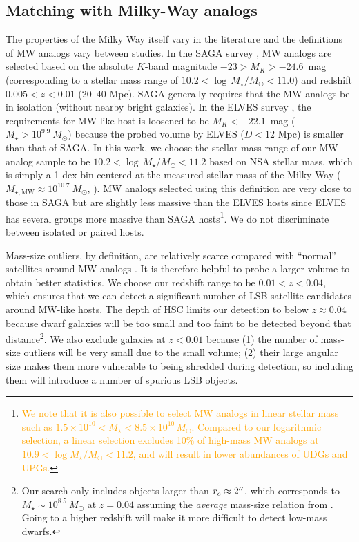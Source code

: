 \documentclass[twocolumn,astrosymb,twocolappendix,linenumbers]{aastex631}
\newcommand{\emphasize}{\textcolor{orange}}
\begin{document}
\begin{CJK*}{UTF8}{gbsn}
\subsection{Matching with Milky-Way analogs}\label{sec:match}
The properties of the Milky Way itself vary in the literature \citep{Licquia2015,Bland-Hawthorn2016} and the definitions of MW analogs vary between studies. In the SAGA survey \citep{SAGA-I,SAGA-II}, MW analogs are selected based on the absolute $K$-band magnitude $-23 > M_K > -24.6$~mag (corresponding to a stellar mass range of $10.2 < \log\, M_\star/M_\odot < 11.0$) and redshift $0.005 < z < 0.01$ (20--40 Mpc). SAGA generally requires that the MW analogs be in isolation (without nearby bright galaxies). In the ELVES survey \citep{ELVES-I,ELVES-II,CarlstenELVES2022}, the requirements for MW-like host is loosened to be $M_K < -22.1$~mag ($M_\star > 10^{9.9}\ M_\odot$) because the probed volume by ELVES ($D<12$ Mpc) is smaller than that of SAGA. In this work, we choose the stellar mass range of our MW analog sample to be $10.2 < \log\, M_\star/M_\odot < 11.2$ based on NSA stellar mass, which is simply a 1 dex bin centered at the measured stellar mass of the Milky Way ($M_{\star, \mathrm{MW}}\approx 10^{10.7}\ M_\odot$, \citealt{Licquia2015}). MW analogs selected using this definition are very close to those in SAGA but are slightly less massive than the ELVES hosts since ELVES has several groups more massive than SAGA hosts\footnote{\emphasize{We note that it is also possible to select MW analogs in linear stellar mass such as $1.5 \times 10^{10} < M_\star < 8.5\times 10^{10}\,M_\odot$. Compared to our logarithmic selection, a linear selection excludes 10\% of high-mass MW analogs at $10.9 < \log M_\star/M_\odot < 11.2$, and will result in lower abundances of UDGs and UPGs.}}. We do not discriminate between isolated or paired hosts. 

Mass-size outliers, by definition, are relatively scarce compared with ``normal'' satellites around MW analogs \citep{SAGA-II,CarlstenELVES2022}. It is therefore helpful to probe a larger volume to obtain better statistics. We choose our redshift range to be $0.01 < z < 0.04$, which ensures that we can detect a significant number of LSB satellite candidates around MW-like hosts. The depth of HSC limits our detection to below $z \approx 0.04$ because dwarf galaxies will be too small and too faint to be detected beyond that distance\footnote{Our search only includes objects larger than $r_e\approx 2\mbox{$^{\prime\prime}$}$, which corresponds to $M_\star \sim 10^{8.5}\ M_\odot$ at $z=0.04$ assuming the \textit{average} mass-size relation from \citet{ELVES-I}. Going to a higher redshift will make it more difficult to detect low-mass dwarfs.}. We also exclude galaxies at $z<0.01$ because (1) the number of mass-size outliers will be very small due to the small volume; (2) their large angular size makes them more vulnerable to being shredded during detection, so including them will introduce a number of spurious LSB objects. 


\end{CJK*}
\end{document}
